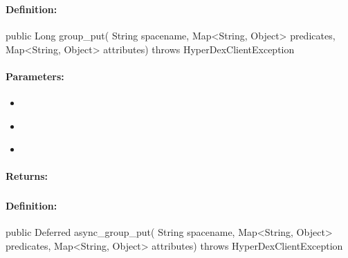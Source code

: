 \subsubsection{}
\label{api:java:group_put}


\paragraph{Definition:}
\begin{javacode}
public Long group_put(
        String spacename,
        Map<String, Object> predicates,
        Map<String, Object> attributes) throws HyperDexClientException
\end{javacode}

\paragraph{Parameters:}
\begin{itemize}[noitemsep]
\item {}\\

\item {}\\

\item {}\\

\end{itemize}

\paragraph{Returns:}


\pagebreak
\subsubsection{}
\label{api:java:async_group_put}


\paragraph{Definition:}
\begin{javacode}
public Deferred async_group_put(
        String spacename,
        Map<String, Object> predicates,
        Map<String, Object> attributes) throws HyperDexClientException
\end{javacode}

